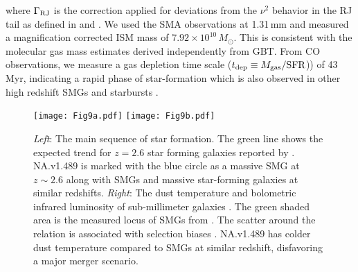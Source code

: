 \documentclass[iop,apj,useAMS,usenatbib]{emulateapj-rtx4}
\begin{document}
where $\Gamma_{\rm RJ}$ is the correction applied for deviations from
the $\nu^2$ behavior in the RJ tail as defined in \citet{Scoville2014}
and \citet{Scoville2016}. We used the SMA observations at 1.31\,mm and
measured a magnification corrected ISM mass of
$7.92\times10^{10}\,M_{\odot}$. This is consistent with the molecular
gas mass estimates derived independently from GBT. From CO
observations, we measure a gas depletion time scale ($t_{\rm
  dep}\equiv M_{\rm gas}/{\rm SFR}$)) of 43\,Myr, indicating a rapid phase
of star-formation which is also observed in other high redshift SMGs
and starbursts \citep{Tacconi2008, Messias2014,
  Oteo2016}. 

\begin{figure*}
\centering
\leavevmode
\texttt{[image: Fig9a.pdf]} 
\texttt{[image: Fig9b.pdf]}
\caption{{\it Left}: The main sequence of star formation. The green line shows
  the expected trend for $z=2.6$ star forming galaxies
  reported by \citet {Speagle2014}. NA.v1.489 is marked with the
blue circle as a massive SMG at $z\sim2.6$ along with SMGs
\citep{Ivison2011, Magnelli2012}
and massive star-forming galaxies \citep{Tacconi2010} at
similar redshifts. {\it Right}: The dust temperature and bolometric
infrared luminosity of sub-millimeter galaxies \citep{Magnelli2012, Casey2012, Bussmann2013}. The
green shaded area is the measured locus of SMGs from
\citet{Chapman2005}. The scatter around
the relation is associated with selection biases \citep{Wardlow2011,
  Magnelli2012}. NA.v1.489 has colder dust temperature compared to
SMGs at similar redshift, disfavoring a major merger scenario.}
\label{fig:Fig9}
\end{figure*}
\end{document}
